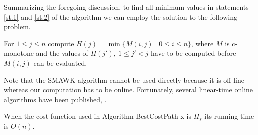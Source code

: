 Summarizing the foregoing discussion, to find all minimum values in statements \ref{st.1} and \ref{st.2} of the algorithm we can employ the solution to the following problem.
\begin{problem}
		For $1\leq j \leq n$ compute $H(j)=\min \{M(i,j) \mid 0\leq i \leq n\}$, where 
		$M$ is c-monotone and
	the values of $H(j'),\ 1\leq j'<j$ have to be computed before $M(i,j)$ can be evaluated.
\end{problem}
Note that the SMAWK algorithm cannot
be used directly because it is off-line whereas our computation has to be online.
Fortunately, several linear-time online algorithms have been published, 
\cite{klawe89,larmore91,galil92,barnoy09}.

\begin{theorem}
	When the cost function used in Algorithm BestCostPath-x is $H_s$ its running time is $O(n)$.
\end{theorem}

\
